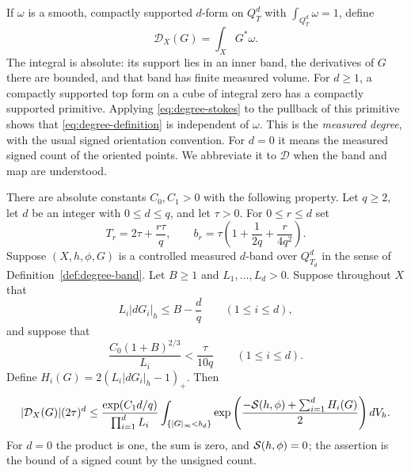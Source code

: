 If $\omega$ is a smooth, compactly supported $d$-form on $Q_T^d$ with
$\int_{Q_T^d}\omega=1$, define
\begin{equation}\label{eq:degree-definition}
              \mathcal D_X(G)=\int_X G^*\omega.
\end{equation}
The integral is absolute: its support lies in an inner band, the
derivatives of $G$ there are bounded, and that band has finite measured
volume.  For $d\ge1$, a compactly supported top form on a cube of integral
zero has a compactly supported primitive.  Applying \eqref{eq:degree-stokes} to the
pullback of this primitive shows that \eqref{eq:degree-definition} is
independent of $\omega$.  This is the \emph{measured degree}, with the
usual signed orientation convention.  For $d=0$ it means the measured
signed count of the oriented points.  We abbreviate it to $\mathcal D$
when the band and map are understood.

\begin{theorem}\label{thm:degree}
There are absolute constants $C_0,C_1>0$ with the following property.
Let $q\ge2$, let $d$ be an integer with $0\le d\le q$, and let $\tau>0$.
For $0\le r\le d$ set
\begin{equation}\label{eq:degree-widths}
 T_r=2\tau+\frac{r\tau}{q},\qquad
 b_r=\tau\left(1+\frac1{2q}+\frac r{4q^2}\right).
\end{equation}
Suppose $(X,h,\phi,G)$ is a controlled measured $d$-band over $Q_{T_d}^d$
in the sense of Definition~\ref{def:degree-band}.  Let $B\ge1$ and
$L_1,\ldots,L_d>0$.  Suppose throughout $X$ that
\begin{equation}\label{eq:degree-horizon-bound}
             L_i|dG_i|_h\le B-\frac dq\qquad(1\le i\le d),
\end{equation}
and suppose that
\begin{equation}\label{eq:degree-horizon}
       \frac{C_0(1+B)^{2/3}}{L_i}<\frac{\tau}{10q}
                       \qquad(1\le i\le d).
\end{equation}
Define $H_i(G)=2(L_i|dG_i|_h-1)_+$.  Then
\begin{equation}\label{eq:degree-estimate}
 |\mathcal D_X(G)|(2\tau)^d
 \le \frac{\exp(C_1d/q)}{\prod_{i=1}^dL_i}
     \int_{\{|G|_\infty<b_d\}}
       \exp\left(\frac{-\mathcal S(h,\phi)+\sum_{i=1}^dH_i(G)}2\right)dV_h.
\end{equation}
For $d=0$ the product is one, the sum is zero, and
$\mathcal S(h,\phi)=0$; the assertion is the bound of a signed count by the
unsigned count.
\end{theorem}

